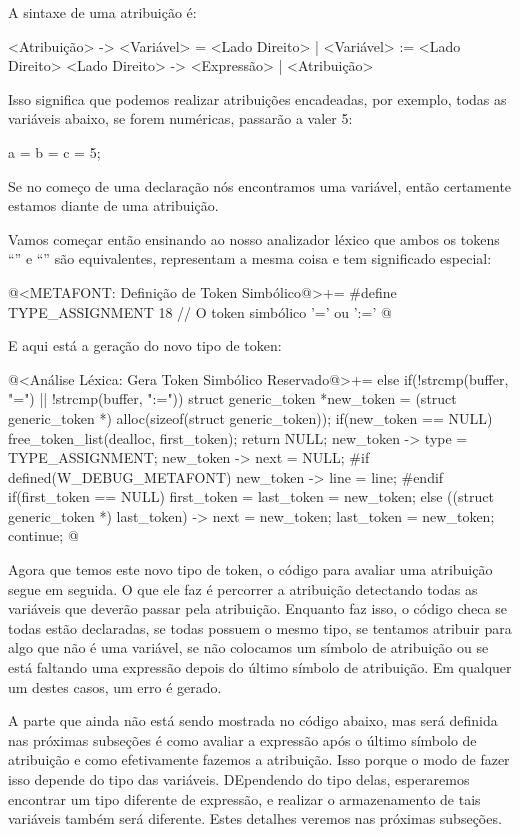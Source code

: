 A sintaxe de uma atribuição é:

\alinhaverbatim
<Atribuição> -> <Variável> = <Lado Direito> |
                <Variável> := <Lado Direito>
<Lado Direito> -> <Expressão> | <Atribuição>
\alinhanormal

Isso significa que podemos realizar atribuições encadeadas, por
exemplo, todas as variáveis abaixo, se forem numéricas, passarão a
valer 5:

\alinhaverbatim
a = b = c = 5;
\alinhanormal

Se no começo de uma declaração nós encontramos uma variável, então
certamente estamos diante de uma atribuição.

Vamos começar então ensinando ao nosso analizador léxico que ambos os
tokens ``\monoespaco{=}'' e ``\monoespaco{:=}'' são equivalentes,
representam a mesma coisa e tem significado especial:

\iniciocodigo
@<METAFONT: Definição de Token Simbólico@>+=
#define TYPE_ASSIGNMENT            18 // O token simbólico '=' ou ':='
@
\fimcodigo

E aqui está a geração do novo tipo de token:

\iniciocodigo
@<Análise Léxica: Gera Token Simbólico Reservado@>+=
else if(!strcmp(buffer, "=") || !strcmp(buffer, ":=")){
  struct generic_token *new_token =
     (struct generic_token *) alloc(sizeof(struct generic_token));
  if(new_token == NULL){
    free_token_list(dealloc, first_token);
    return NULL;
  }
  new_token -> type = TYPE_ASSIGNMENT;
  new_token -> next = NULL;
#if defined(W_DEBUG_METAFONT)
  new_token -> line = line;
#endif
  if(first_token == NULL)
    first_token = last_token = new_token;
  else{
    ((struct generic_token *) last_token) -> next = new_token;
    last_token = new_token;
  }
  continue;
}
@
\fimcodigo

Agora que temos este novo tipo de token, o código para avaliar uma
atribuição segue em seguida. O que ele faz é percorrer a atribuição
detectando todas as variáveis que deverão passar pela
atribuição. Enquanto faz isso, o código checa se todas estão
declaradas, se todas possuem o mesmo tipo, se tentamos atribuir para
algo que não é uma variável, se não colocamos um símbolo de atribuição
ou se está faltando uma expressão depois do último símbolo de
atribuição. Em qualquer um destes casos, um erro é gerado.

A parte que ainda não está sendo mostrada no código abaixo, mas será
definida nas próximas subseções é como avaliar a expressão após o
último símbolo de atribuição e como efetivamente fazemos a
atribuição. Isso porque o modo de fazer isso depende do tipo das
variáveis. DEpendendo do tipo delas, esperaremos encontrar um tipo
diferente de expressão, e realizar o armazenamento de tais variáveis
também será diferente. Estes detalhes veremos nas próximas subseções.


